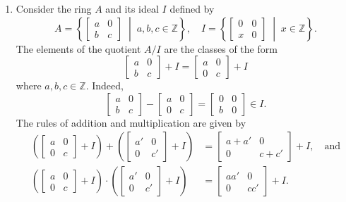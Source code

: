 \documentclass[11pt,a4paper]{article}
\begin{document}
\begin{exa}
\begin{enumerate}[label=(\roman*)]
\item Consider the ring \( A \) and its ideal \( I \) defined by
\[
A =   \left\{ \begin{bmatrix} a & 0 \\ b & c \end{bmatrix} \;\middle|\; a, b, c \in \mathbb{Z} \right\},\quad I = \left\{ \begin{bmatrix} 0 & 0 \\ x & 0 \end{bmatrix} \;\middle|\; x \in \mathbb{Z} \right\}.
\]
The elements of the quotient \( A/I \) are the classes of the form
\[
\begin{bmatrix} a & 0 \\ b & c \end{bmatrix} + I = \begin{bmatrix} a & 0 \\ 0 & c \end{bmatrix} + I
\]
where \( a, b, c \in \mathbb{Z} \).
Indeed,
\[
\begin{bmatrix} a & 0 \\ b & c \end{bmatrix} - \begin{bmatrix} a & 0 \\ 0 & c \end{bmatrix} = \begin{bmatrix} 0 & 0 \\ b & 0 \end{bmatrix} \in I.
\]
The rules of addition and multiplication are given by
\begin{align*}
    \left( \begin{bmatrix} a & 0 \\ 0 & c \end{bmatrix} + I \right) + \left( \begin{bmatrix} a' & 0 \\ 0 & c' \end{bmatrix} + I \right) &= \begin{bmatrix} a + a' & 0 \\ 0 & c + c' \end{bmatrix} + I,\quad\text{and}\\
    \left( \begin{bmatrix} a & 0 \\ 0 & c \end{bmatrix} + I \right) \cdot \left( \begin{bmatrix} a' & 0 \\ 0 & c' \end{bmatrix} + I \right) &= \begin{bmatrix} aa' & 0 \\ 0 & cc' \end{bmatrix} + I.
\end{align*}

\end{enumerate}
\end{exa}
\end{document}
